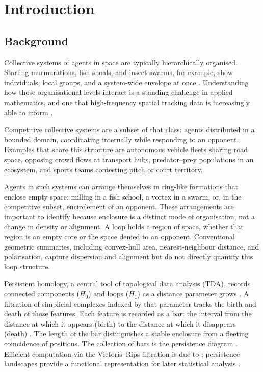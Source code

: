 \section{Introduction}

\subsection{Background}
\label{sec:background}

Collective systems of agents in space are typically hierarchically
organised. Starling murmurations, fish shoals, and insect swarms, for
example, show individuals, local groups, and a system-wide envelope at
once \citep{sumpter2006}. Understanding how those organisational levels
interact is a standing challenge in applied mathematics, and one that
high-frequency spatial tracking data is increasingly able to inform
\citep{herbertread2011}.

Competitive collective systems are a subset of that class: agents
distributed in a bounded domain, coordinating internally while
responding to an opponent. Examples that share this structure are
autonomous vehicle fleets sharing road space, opposing crowd flows at
transport hubs, predator--prey populations in an ecosystem, and sports
teams contesting pitch or court territory.

Agents in such systems can arrange themselves in ring-like formations
that enclose empty space: milling in a fish school, a vortex in a
swarm, or, in the competitive subset, encirclement of an opponent.
These arrangements are important to identify because enclosure is a
distinct mode of organisation, not a change in density or alignment.
A loop holds a region of space, whether that region is an empty core or
the space denied to an opponent. Conventional geometric summaries,
including convex-hull area, nearest-neighbour distance, and
polarisation, capture dispersion and alignment \citep{sumpter2006} but
do not directly quantify this loop structure.

Persistent homology, a central tool of topological data analysis (TDA),
records connected components ($H_0$) and loops ($H_1$) as a distance
parameter grows
\citep{edelsbrunner2002,edelsbrunner2010,carlsson2009,munch2017,chazal2021}.
A filtration of simplicial complexes indexed by that parameter tracks
the birth and death of those features. Each feature is recorded as a
bar: the interval from the distance at which it appears (birth) to the
distance at which it disappears (death) \citep{ghrist2008}. The length
of the bar distinguishes a stable enclosure from a fleeting coincidence
of positions. The collection of bars is the persistence diagram
\citep{cohensteiner2007}. Efficient computation via the Vietoris--Rips
filtration is due to \citet{bauer2021ripser}; persistence landscapes
provide a functional representation for later statistical analysis
\citep{bubenik2015}.

